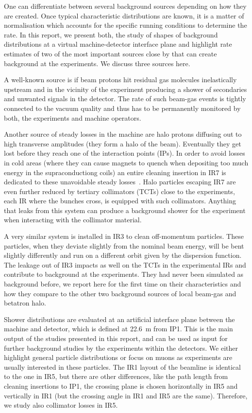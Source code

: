 One can differentiate between several background sources depending on how they are created. Once typical characteristic distributions are known, it is a matter of normalisation which accounts for the specific running conditions to determine the rate. In this report, we present both, the study of shapes of background distributions at a virtual machine-detector interface plane and highlight rate estimates of two of the most important sources close by that can create background at the experiments. We discuss three sources here.

A well-known source is if beam protons hit residual gas molecules inelastically upstream and in the vicinity of the experiment producing a shower of secondaries and unwanted signals in the detector. The rate of such beam-gas events is tightly connected to the vacuum quality and thus has to be permanently monitored by both, the experiments and machine operators.

Another source of steady losses in the machine are halo protons diffusing out to high transverse amplitudes (they form a halo of the beam). Eventually they get lost before they reach one of the interaction points (IPs). In order to avoid losses in cold areas (where they can cause magnets to quench when depositing too much energy in the supraconductiong coils) an entire cleaning insertion in IR7 is dedicated to these unavoidable steady losses~\cite{LHCDesignRep,assmann05chamonix}. Halo particles escaping IR7 are even further reduced by tertiary collimators (TCTs) close to the experiments, each IR where the bunches cross, is equipped with such collimators. Anything that leaks from this system can produce a background shower for the experiment when interacting with the collimator material. 

A very similar system is installed in IR3 to clean off-momentum particles. These particles, when they deviate slightly from the nominal beam energy, will be bent slightly differently and run on a different orbit given by the dispersion function. The leakage out of IR3 impacts as well on the TCTs in the experimental IRs and contribute to background at the experiments. They had never been simulated as background before, we report here for the first time on their characteristics and how they compare to the other two background sources of local beam-gas and betatron halo. 

Shower distributions are evaluated at an artificial interface plane between the machine and detector, which is defined at 22.6~m from IP1. This is the main output of the studies presented in this report, and can be used as input for further background studies by the experiments within the detectors. We either highlight general particle distributions or focus on muons as experiments are usually interested in these particles. The IR1 layout of the beamline is identical to the one in IR5, but there are other differences, like the path length from cleaning insertions to IP1, the crossing plane is chosen horizontally in IR5 and vertically in IR1 (but the crossing angle in IR1 and IR5 are the same). Therefore, we study also collimator losses in IR5.

